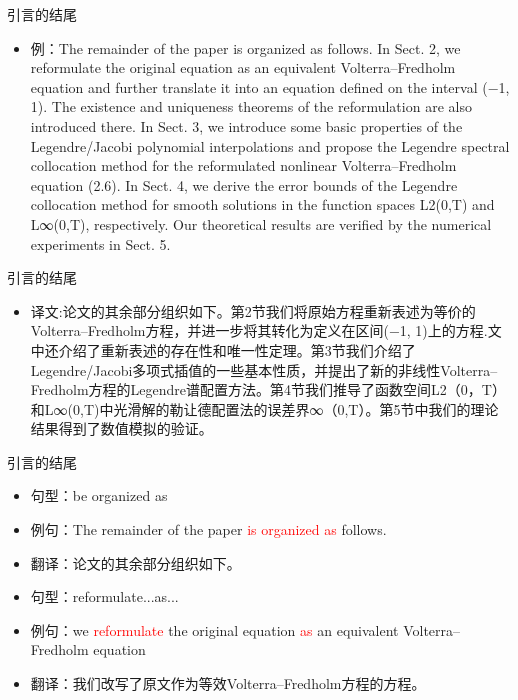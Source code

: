 \documentclass[13pt]{ctexbeamer}
\newcommand{\red}[1]{\textcolor{red}{#1}}
\begin{document}
\begin{frame}{引言的结尾}

\begin{itemize}
    \item
    例：The remainder of the paper is organized as follows. In Sect. 2, we reformulate the original equation as an equivalent Volterra–Fredholm equation and further translate it into an equation defined on the interval (−1, 1). The existence and uniqueness theorems of the reformulation are also introduced there. In Sect. 3, we introduce some basic properties of the Legendre/Jacobi polynomial interpolations and propose the Legendre spectral collocation method for the reformulated nonlinear Volterra–Fredholm equation (2.6). In Sect. 4, we derive the error bounds of the Legendre collocation method for smooth solutions in the function spaces L2(0,T) and L∞(0,T), respectively. Our theoretical results are verified by the numerical experiments in Sect. 5.

\end{itemize}
\end{frame}

\begin{frame}{引言的结尾}

\begin{itemize}
    \item 译文:论文的其余部分组织如下。第2节我们将原始方程重新表述为等价的Volterra–Fredholm方程，并进一步将其转化为定义在区间(−1, 1)上的方程.文中还介绍了重新表述的存在性和唯一性定理。第3节我们介绍了Legendre/Jacobi多项式插值的一些基本性质，并提出了新的非线性Volterra–Fredholm方程的Legendre谱配置方法。第4节我们推导了函数空间L2（0，T）和L∞(0,T)中光滑解的勒让德配置法的误差界∞（0,T）。第5节中我们的理论结果得到了数值模拟的验证。

\end{itemize}
\end{frame}

\begin{frame}{引言的结尾}

\begin{itemize}
    \item 句型：be organized as
    \item 例句：The remainder of the paper \red{is organized as} follows.
    \item 翻译：论文的其余部分组织如下。
    \newline
    \newline
    \item 句型：reformulate...as...
    \item 例句：we \red{reformulate} the original equation \red{as} an equivalent Volterra–Fredholm equation
    \item 翻译：我们改写了原文作为等效Volterra–Fredholm方程的方程。

\end{itemize}
\end{frame}
\end{document}

